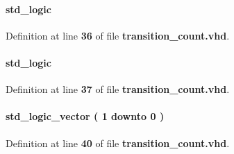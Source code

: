 \paragraph[{high\+\_\+trans}]{ {\bfseries \textcolor{comment}{std\+\_\+logic}\textcolor{vhdlchar}{ }} \hspace{0.3cm}{\ttfamily [Signal]}}\label{classtransition__count_1_1arch_a7e9be1ea8debd5cfdc5f6a150a159cd4}


Definition at line {\bf 36} of file {\bf transition\+\_\+count.\+vhd}.

\paragraph[{low\+\_\+trans}]{ {\bfseries \textcolor{comment}{std\+\_\+logic}\textcolor{vhdlchar}{ }} \hspace{0.3cm}{\ttfamily [Signal]}}\label{classtransition__count_1_1arch_a67603a124bff18bcc6ad4be4fe19c76a}


Definition at line {\bf 37} of file {\bf transition\+\_\+count.\+vhd}.

\paragraph[{test\+\_\+en\+\_\+reg}]{ {\bfseries \textcolor{comment}{std\+\_\+logic\+\_\+vector}\textcolor{vhdlchar}{ }\textcolor{vhdlchar}{(}\textcolor{vhdlchar}{ }\textcolor{vhdlchar}{ } \textcolor{vhdldigit}{1} \textcolor{vhdlchar}{ }\textcolor{keywordflow}{downto}\textcolor{vhdlchar}{ }\textcolor{vhdlchar}{ } \textcolor{vhdldigit}{0} \textcolor{vhdlchar}{ }\textcolor{vhdlchar}{)}\textcolor{vhdlchar}{ }} \hspace{0.3cm}{\ttfamily [Signal]}}\label{classtransition__count_1_1arch_a46a04c6cb1df7ed695c88bb6f815c26f}


Definition at line {\bf 40} of file {\bf transition\+\_\+count.\+vhd}.

